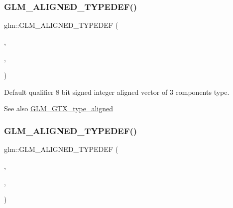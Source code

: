 \subsubsection{\texorpdfstring{G\+L\+M\+\_\+\+A\+L\+I\+G\+N\+E\+D\+\_\+\+T\+Y\+P\+E\+D\+E\+F()}{GLM\_ALIGNED\_TYPEDEF()}\hspace{0.1cm}{\footnotesize\ttfamily [55/209]}}
{\footnotesize\ttfamily glm\+::\+G\+L\+M\+\_\+\+A\+L\+I\+G\+N\+E\+D\+\_\+\+T\+Y\+P\+E\+D\+EF (\begin{DoxyParamCaption}\item[{\hyperlink{group__gtc__type__precision_ga9babb834daa1f84c23821bd21669c2e8}{i8vec3}}]{,  }\item[{aligned\+\_\+i8vec3}]{,  }\item[{4}]{ }\end{DoxyParamCaption})}

Default qualifier 8 bit signed integer aligned vector of 3 components type. \begin{DoxySeeAlso}{See also}
\hyperlink{group__gtx__type__aligned}{G\+L\+M\+\_\+\+G\+T\+X\+\_\+type\+\_\+aligned} 
\end{DoxySeeAlso}
\mbox{\label{group__gtx__type__aligned_ga1fe6fc032a978f1c845fac9aa0668714}} 
\subsubsection{\texorpdfstring{G\+L\+M\+\_\+\+A\+L\+I\+G\+N\+E\+D\+\_\+\+T\+Y\+P\+E\+D\+E\+F()}{GLM\_ALIGNED\_TYPEDEF()}\hspace{0.1cm}{\footnotesize\ttfamily [56/209]}}
{\footnotesize\ttfamily glm\+::\+G\+L\+M\+\_\+\+A\+L\+I\+G\+N\+E\+D\+\_\+\+T\+Y\+P\+E\+D\+EF (\begin{DoxyParamCaption}\item[{\hyperlink{group__gtc__type__precision_gaaad99cfb998ddcb74e9c33d0149fdd0e}{i8vec4}}]{,  }\item[{aligned\+\_\+i8vec4}]{,  }\item[{4}]{ }\end{DoxyParamCaption})}

